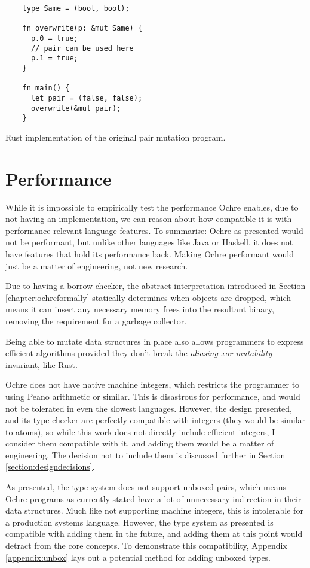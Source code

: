 \documentclass[12pt,twoside]{report}
\begin{document}
\begin{listing}
  \begin{verbatim}
    type Same = (bool, bool);

    fn overwrite(p: &mut Same) {
      p.0 = true;
      // pair can be used here
      p.1 = true;
    }

    fn main() {
      let pair = (false, false);          
      overwrite(&mut pair);
    }
  \end{verbatim}
  \caption{Rust implementation of the original pair mutation program.}
  \label{listing:pairmutationrustunsafe}
\end{listing}

\section{Performance}
While it is impossible to empirically test the performance Ochre enables, due to not having an implementation, we can reason about how compatible it is with performance-relevant language features. To summarise: Ochre as presented would not be performant, but unlike other languages like Java or Haskell, it does not have features that hold its performance back. Making Ochre performant would just be a matter of engineering, not new research.

Due to having a borrow checker, the abstract interpretation introduced in Section \ref{chapter:ochreformally} statically determines when objects are dropped, which means it can insert any necessary memory frees into the resultant binary, removing the requirement for a garbage collector.

Being able to mutate data structures in place also allows programmers to express efficient algorithms provided they don't break the \textit{aliasing xor mutability} invariant, like Rust.

Ochre does not have native machine integers, which restricts the programmer to using Peano arithmetic or similar. This is disastrous for performance, and would not be tolerated in even the slowest languages. However, the design presented, and its type checker are perfectly compatible with integers (they would be similar to atoms), so while this work does not directly include efficient integers, I consider them compatible with it, and adding them would be a matter of engineering. The decision not to include them is discussed further in Section \ref{section:designdecisions}.

As presented, the type system does not support unboxed pairs, which means Ochre programs as currently stated have a lot of unnecessary indirection in their data structures. Much like not supporting machine integers, this is intolerable for a production systems language. However, the type system as presented is compatible with adding them in the future, and adding them at this point would detract from the core concepts. To demonstrate this compatibility, Appendix \ref{appendix:unbox} lays out a potential method for adding unboxed types.
\end{document}
